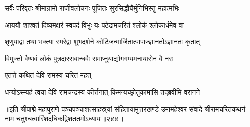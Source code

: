 \twolineshloka
{सर्वैः परिवृतः श्रीमान्रामो राजीवलोचनः}
{पूजितः सुरसिद्धौघैर्मुनिभिस्तु महात्मभिः}%

\twolineshloka
{आययौ शाश्वतं दिव्यमक्षरं स्वपदं विभुः}
{यः पठेद्रामचरितं श्लोकं श्लोकार्धमेव वा}%

\twolineshloka
{शृणुयाद्वा तथा भक्त्या स्मरेद्वा शुभदर्शने}
{कोटिजन्मार्जितात्पापाज्ज्ञानतोऽज्ञानतः कृतात्}%

\twolineshloka
{विमुक्तो वैष्णवं लोकं पुत्रदारसबान्धवैः}
{समाप्नुयाद्योगगम्यमनायासेन वै नरः}%

एतत्ते कथितं देवि रामस्य चरितं महत्

\twolineshloka
{धन्योऽस्म्यहं त्वया देवि रामचन्द्रस्य कीर्त्तनात्}
{किमन्यच्छ्रोतुकामासि तद्ब्रवीमि वरानने}%

॥इति श्रीपाद्मे महापुराणे पञ्चपञ्चाशत्साहस्र्यां संहितायामुत्तरखण्डे उमामहेश्वर संवादे श्रीरामचरितकथनं नाम चतुश्चत्वारिंशदधिकद्विशततमोऽध्यायः॥२४४॥


